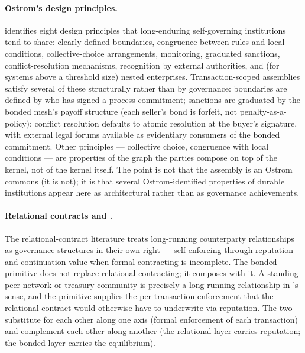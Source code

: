 \documentclass[11pt,a4paper]{article}
\theoremstyle{definition}
\theoremstyle{remark}
\begin{document}
\paragraph{Ostrom's design principles.}
\citet{ostrom1990governing} identifies eight design principles
that long-enduring self-governing institutions tend to share:
clearly defined boundaries, congruence between rules and local
conditions, collective-choice arrangements, monitoring, graduated
sanctions, conflict-resolution mechanisms, recognition by external
authorities, and (for systems above a threshold size) nested
enterprises. Transaction-scoped assemblies satisfy several of
these structurally rather than by governance: boundaries are
defined by who has signed a process commitment; sanctions are
graduated by the bonded mesh's payoff structure (each seller's
bond is forfeit, not penalty-as-a-policy); conflict resolution
defaults to atomic resolution at the buyer's signature, with
external legal forums available as evidentiary consumers of the
bonded commitment. Other principles --- collective
choice, congruence with local conditions --- are properties of the
graph the parties compose on top of the kernel, not of the kernel
itself. The point is not that the assembly is an Ostrom commons
(it is not); it is that several Ostrom-identified properties of
durable institutions appear here as architectural rather than as
governance achievements.

\paragraph{Relational contracts and \citeauthor{macneil1980new}.}
The relational-contract literature \citep{macneil1980new,
gibbons2005four} treats long-running counterparty relationships
as governance structures in their own right --- self-enforcing
through reputation and continuation value when formal contracting
is incomplete. The bonded primitive does not replace relational
contracting; it composes with it. A standing peer network or
treasury community is precisely a long-running relationship in
\citeauthor{macneil1980new}'s sense, and the primitive supplies
the per-transaction enforcement that the relational contract
would otherwise have to underwrite via reputation. The two
substitute for each other along one axis (formal enforcement of
each transaction) and complement each other along another (the
relational layer carries reputation; the bonded layer carries
the equilibrium).
\end{document}
